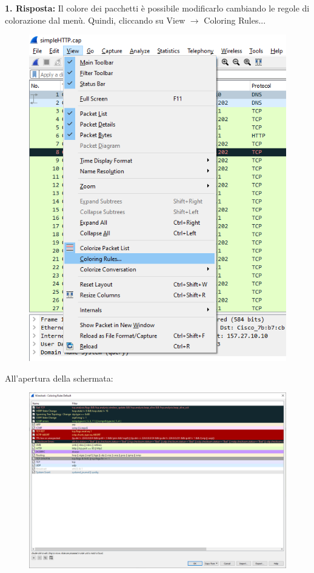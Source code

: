 \documentclass[a4paper]{article}
\begin{document}
	\noindent
	\textcolor{Green4}{\textbf{1. Risposta:}} Il colore dei pacchetti è possibile modificarlo cambiando le regole di colorazione dal menù. Quindi, cliccando su \textsf{View} $\rightarrow$ \textsf{Coloring Rules...}
	\begin{figure}[!htp]
		\centering
		\includegraphics[width=.7\textwidth]{img/wireshark/ex2-1.png}
	\end{figure}\newpage
	
	\noindent
	All'apertura della schermata:
	\begin{figure}[!htp]
		\centering
		\includegraphics[width=\textwidth]{img/wireshark/ex2-2.png}
	\end{figure}
	
\end{document}
